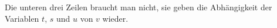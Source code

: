 \begin{loesung}
Die unteren drei Zeilen braucht man
nicht, sie geben die Abhängigkeit der Variablen $t$, $s$ und $u$
von $v$ wieder.
% 

\end{loesung}
